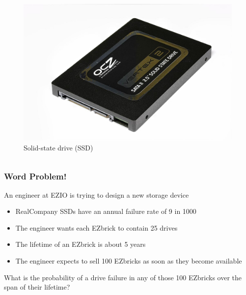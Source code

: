 \documentclass{beamer}
\theoremstyle{mystyle}
\begin{document}
\begin{frame}
\begin{columns}
\begin{figure}
			\includegraphics[scale=0.10]{ssd.jpg}
			\caption{Solid-state drive (SSD)}
		\end{figure}
\end{columns}
\end{frame}


\begin{frame}
\frametitle{Word Problem!}
An engineer at EZIO is trying to design a new storage device
\vspace{0.2in}
	\begin{itemize}
		\item RealCompany SSDs have an annual failure rate of 9 in 1000
		\pause
		\vspace{0.1in}
		\item The engineer wants each EZbrick to contain 25 drives
		\pause
		\vspace{0.1in}
		\item The lifetime of an EZbrick is about 5 years
		\pause
		\vspace{0.1in} 
		\item The engineer expects to sell 100 EZbricks as soon as they become available
	\end{itemize}
\pause
\vspace{0.2in}
What is the probability of a drive failure in any of those 100 EZbricks over the span of their lifetime?

	
\end{frame}
\end{document}
